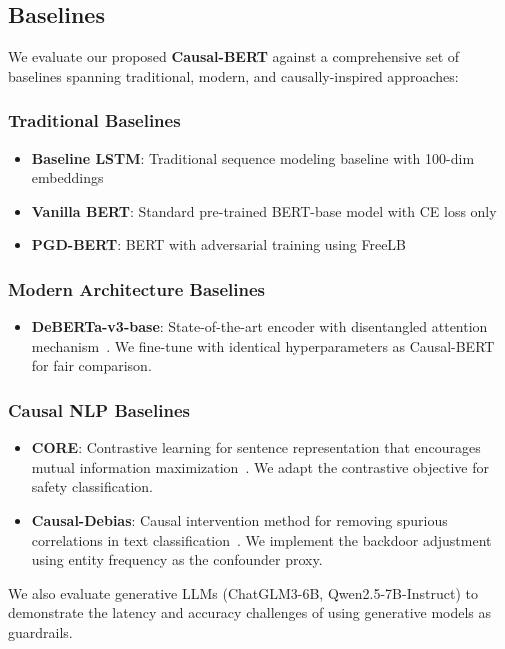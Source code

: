 \documentclass{acmart}
\begin{document}
\subsection{Baselines}
We evaluate our proposed \textbf{Causal-BERT} against a comprehensive set of baselines spanning traditional, modern, and causally-inspired approaches:

\subsubsection{Traditional Baselines}
\begin{itemize}
\item \textbf{Baseline LSTM}: Traditional sequence modeling baseline with 100-dim embeddings
\item \textbf{Vanilla BERT}: Standard pre-trained BERT-base model with CE loss only
\item \textbf{PGD-BERT}: BERT with adversarial training using FreeLB~\cite{zhu2020freelb}
\end{itemize}

\subsubsection{Modern Architecture Baselines}
\begin{itemize}
\item \textbf{DeBERTa-v3-base}: State-of-the-art encoder with disentangled attention mechanism~\cite{he2021deberta}. We fine-tune with identical hyperparameters as Causal-BERT for fair comparison.
\end{itemize}

\subsubsection{Causal NLP Baselines}
\begin{itemize}
\item \textbf{CORE}: Contrastive learning for sentence representation that encourages mutual information maximization~\cite{kong2020contrastive}. We adapt the contrastive objective for safety classification.
\item \textbf{Causal-Debias}: Causal intervention method for removing spurious correlations in text classification~\cite{wang2021causal}. We implement the backdoor adjustment using entity frequency as the confounder proxy.
\end{itemize}

We also evaluate generative LLMs (ChatGLM3-6B, Qwen2.5-7B-Instruct) to demonstrate the latency and accuracy challenges of using generative models as guardrails.
\end{document}
